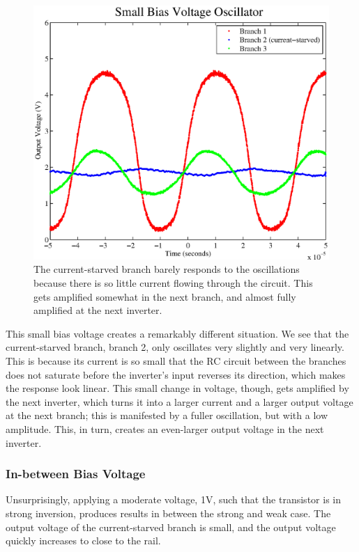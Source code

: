 \documentclass{article}
\begin{document}
\begin{figure}[H]
\centering
\includegraphics[scale=.6]{small_bias.eps}
\caption{The current-starved branch barely responds to the oscillations because there is so little current flowing through the circuit.  This gets amplified somewhat in the next branch, and almost fully amplified at the next inverter.}
\label{smallBias}
\end{figure}

This small bias voltage creates a remarkably different situation.  We see that the current-starved branch, branch 2, only oscillates very slightly and very linearly.  This is because its current is so small that the RC circuit between the branches does not saturate before the inverter's input reverses its direction, which makes the response look linear.  This small change in voltage, though, gets amplified by the next inverter, which turns it into a larger current and a larger output voltage at the next branch; this is manifested by a fuller oscillation, but with a low amplitude. This, in turn, creates an even-larger output voltage in the next inverter.

\subsubsection*{In-between Bias Voltage}

Unsurprisingly, applying a moderate voltage, 1V, such that the transistor is in strong inversion, produces results in between the strong and weak case.  The output voltage of the current-starved branch is small, and the output voltage quickly increases to close to the rail.
\end{document}
